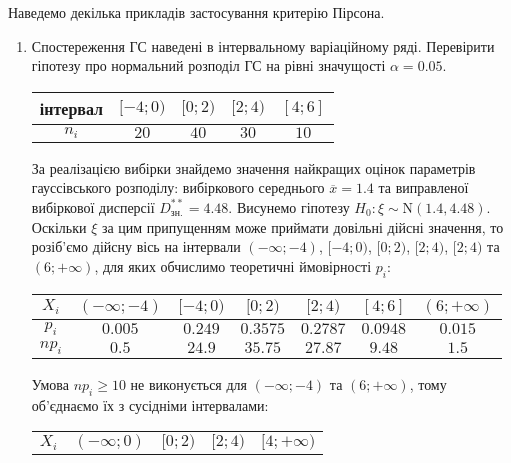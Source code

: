 Наведемо декілька прикладів застосування критерію Пірсона.
\begin{example}
    \begin{enumerate}
        \item Спостереження ГС наведені в інтервальному варіаційному ряді. Перевірити гіпотезу про нормальний розподіл ГС
        на рівні значущості $\alpha = 0.05$.
        \begin{center}
            \begin{tabular}{|c|c|c|c|c|}
                \hline
                інтервал & $[-4; 0)$ & $[0; 2)$ & $[2; 4)$ & $[4; 6]$ \\
                \hline
                $n_i$ & $20$ & $40$ & $30$ & $10$ \\
                \hline
            \end{tabular}
        \end{center}
            За реалізацією вибірки знайдемо значення найкращих 
            оцінок параметрів гауссівського розподілу: вибіркового середнього $\overline{x} = 1.4$ та виправленої вибіркової
            дисперсії $D^{**}_{\text{зн.}} = 4.48$. Висунемо гіпотезу $H_0:\xi \sim \mathrm{N}(1.4, 4.48)$. Оскільки $\xi$ за цим припущенням може приймати довільні дійсні значення, то розіб'ємо
            дійсну вісь на інтервали $(-\infty; -4)$, $[-4; 0)$, $[0; 2)$, $[2; 4)$, $[2; 4)$ та $(6; +\infty)$, для яких обчислимо теоретичні ймовірності $p_i$:
            \begin{center}
                \begin{tabular}{|c|c|c|c|c|c|c|}
                    \hline
                    $X_i$ & $(-\infty; -4)$ & $[-4; 0)$ & $[0; 2)$ & $[2; 4)$ & $[4; 6]$ & $(6; +\infty)$\\
                    \hline
                    $p_i$ & $0.005$ & $0.249$ & $0.3575$ & $0.2787$ & $0.0948$ & $0.015$ \\
                    \hline
                    $n p_i$ & $0.5$ & $24.9$ & $35.75$ & $27.87$ & $9.48$ & $1.5$ \\
                    \hline
                \end{tabular}
            \end{center}
            Умова $np_i \geq 10$ не виконується для $(-\infty; -4)$ та $(6; +\infty)$, тому об'єднаємо їх з сусідніми інтервалами:
            \begin{center}
                \begin{tabular}{|c|c|c|c|c|}
                    \hline
                    $X_i$ & $(-\infty; 0)$ & $[0; 2)$ & $[2; 4)$ & $[4; +\infty)$ \\

\end{tabular}
\end{center}
\end{enumerate}
\end{example}
